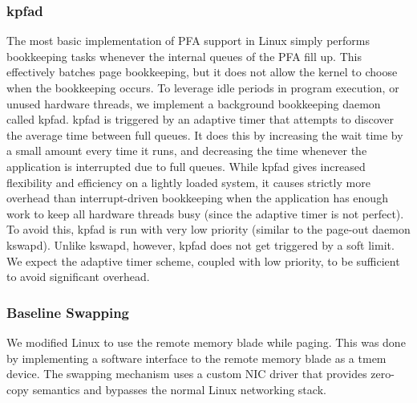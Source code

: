 \subsubsection{kpfad} \label{sec:kpfad}
The most basic implementation of PFA support in Linux simply performs
bookkeeping tasks whenever the internal queues of the PFA fill up. This
effectively batches page bookkeeping, but it does not allow the kernel to
choose when the bookkeeping occurs. To leverage idle periods in
program execution, or unused hardware threads, we implement a background
bookkeeping daemon called \gls{kpfad}. \Gls{kpfad} is triggered by an adaptive
timer that attempts to discover the average time between full queues. It does
this by increasing the wait time by a small amount every time it runs, and
decreasing the time whenever the application is interrupted due to full queues. 
While \gls{kpfad} gives increased flexibility and efficiency on a lightly
loaded system, it causes strictly more overhead than interrupt-driven
bookkeeping when the application has enough work to keep all hardware threads
busy (since the adaptive timer is not perfect). To avoid this, \gls{kpfad} is run
with very low priority (similar to the page-out daemon \gls{kswapd}). Unlike
\gls{kswapd}, however, \gls{kpfad} does not get triggered by a soft limit. We expect
the adaptive timer scheme, coupled with low priority, to be sufficient to avoid
significant overhead.

\subsubsection{Baseline Swapping}
We modified Linux to use the remote memory blade while paging. This was done by
implementing a software interface to the remote memory blade as a \gls{tmem}
device. The swapping mechanism uses a custom NIC driver that provides zero-copy
semantics and bypasses the normal Linux networking stack. 

